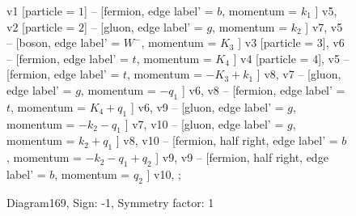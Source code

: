 \documentclass{revtex4}
\begin{document}
\begin{figure}[!htb]
\begin{center}
{    %
v1 [particle = \(1\)] -- [fermion, edge label' = \(b\), momentum = \(k_{1}\) ] v5, 
v2 [particle = \(2\)] -- [gluon, edge label' = \(g\), momentum = \(k_{2}\) ] v7, 
v5 -- [boson, edge label' = \(W^{-}\), momentum = \(K_{3}\) ] v3 [particle = \(3\)], 
v6 -- [fermion, edge label' = \(t\), momentum = \(K_{4}\) ] v4 [particle = \(4\)], 
v5 -- [fermion, edge label' = \(t\), momentum = \(-K_{3} + k_{1}\) ] v8, 
v7 -- [gluon, edge label' = \(g\), momentum = \(-q_{1}\) ] v6, 
v8 -- [fermion, edge label' = \(t\), momentum = \(K_{4} + q_{1}\) ] v6, 
v9 -- [gluon, edge label' = \(g\), momentum = \(-k_{2} - q_{1}\) ] v7, 
v10 -- [gluon, edge label' = \(g\), momentum = \(k_{2} + q_{1}\) ] v8, 
v10 -- [fermion, half right, edge label' = \(b\), momentum = \(-k_{2} - q_{1} + q_{2}\) ] v9, 
v9 -- [fermion, half right, edge label' = \(b\), momentum = \(q_{2}\) ] v10, 
};
\end{center}
\caption{Diagram169, Sign: -1, Symmetry factor: 1}
\end{figure}
\newpage
\end{document}
